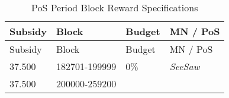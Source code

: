 \documentclass[11pt,a4paperpaper,]{report}
\begin{document}
\begin{longtable}[c]{@{}llll@{}}
\caption{PoS Period Block Reward Specifications
\label{ref_c_table}}\tabularnewline
\toprule
\begin{minipage}[b]{0.12\columnwidth}\raggedright\strut
Subsidy
\strut\end{minipage} &
\begin{minipage}[b]{0.22\columnwidth}\raggedright\strut
Block
\strut\end{minipage} &
\begin{minipage}[b]{0.15\columnwidth}\raggedright\strut
Budget
\strut\end{minipage} &
\begin{minipage}[b]{0.27\columnwidth}\raggedright\strut
MN / PoS
\strut\end{minipage}\tabularnewline
\midrule
\endfirsthead
\toprule
\begin{minipage}[b]{0.12\columnwidth}\raggedright\strut
Subsidy
\strut\end{minipage} &
\begin{minipage}[b]{0.22\columnwidth}\raggedright\strut
Block
\strut\end{minipage} &
\begin{minipage}[b]{0.15\columnwidth}\raggedright\strut
Budget
\strut\end{minipage} &
\begin{minipage}[b]{0.27\columnwidth}\raggedright\strut
MN / PoS
\strut\end{minipage}\tabularnewline
\midrule
\endhead
\begin{minipage}[t]{0.12\columnwidth}\raggedright\strut
37.500
\strut\end{minipage} &
\begin{minipage}[t]{0.22\columnwidth}\raggedright\strut
182701-199999
\strut\end{minipage} &
\begin{minipage}[t]{0.15\columnwidth}\raggedright\strut
0\%
\strut\end{minipage} &
\begin{minipage}[t]{0.27\columnwidth}\raggedright\strut
\textit{SeeSaw}
\strut\end{minipage}\tabularnewline
\begin{minipage}[t]{0.12\columnwidth}\raggedright\strut
37.500
\strut\end{minipage} &
\begin{minipage}[t]{0.22\columnwidth}\raggedright\strut
200000-259200
\strut\end{minipage} &

\end{longtable}
\end{document}
